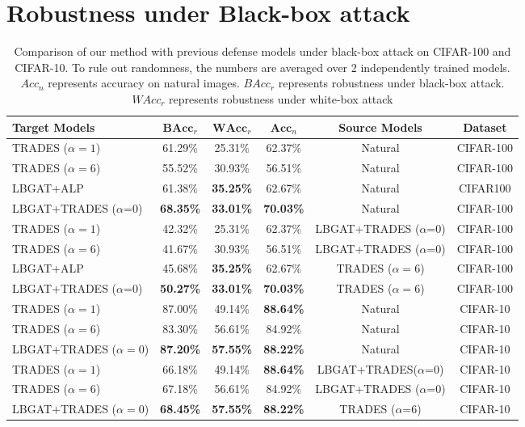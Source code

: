 \documentclass[10pt,twocolumn,letterpaper]{article}
\begin{document}
\vspace{1.0in}	
\section{Robustness under Black-box attack}

\begin{table*}[h]
	\centering
	\caption{Comparison of our method with previous defense models under black-box attack on CIFAR-100 and CIFAR-10. To rule out randomness, the numbers are averaged over 2 independently trained models. $Acc_{n}$ represents accuracy on natural images. $BAcc_{r}$ represents robustness under black-box attack. $WAcc_{r}$ represents robustness under white-box attack}
	\begin{tabular}{l|c|c | c | c|c }
		\textbf{Target Models} &$\textbf{BAcc}_{r}$ &$\textbf{WAcc}_{r}$  & $\textbf{Acc}_{n}$ &\textbf{Source Models}  &\textbf{Dataset}\\
		\hline
		\hline
		TRADES ($\alpha=1$)  &61.29\%  &25.31\%  &62.37\%  &Natural &CIFAR-100\\
		TRADES ($\alpha=6$)  &55.52\%  &30.93\%  &56.51\%  &Natural &CIFAR-100\\
		LBGAT+ALP            &61.38\%  &\textbf{35.25\%}  &62.67\%  &Natural &CIFAR100\\
		LBGAT+TRADES ($\alpha$=0)  &\textbf{68.35\%} &\textbf{33.01\%} &\textbf{70.03\%} &Natural &CIFAR-100\\
		\hline
		TRADES ($\alpha=1$) &42.32\% &25.31\% &62.37\% &LBGAT+TRADES ($\alpha$=0) &CIFAR-100\\
		TRADES ($\alpha=6$) &41.67\% &30.93\% &56.51\% &LBGAT+TRADES ($\alpha$=0) &CIFAR-100\\
		LBGAT+ALP     &45.68\% &\textbf{35.25\%} &62.67\% &TRADES ($\alpha=6$)  &CIFAR-100\\
		LBGAT+TRADES ($\alpha$=0) &\textbf{50.27\%} &\textbf{33.01\%}  &\textbf{70.03\%} &TRADES ($\alpha=6$) &CIFAR-100\\
		\hline
		TRADES ($\alpha=1$)  &87.00\% &49.14\%  &\textbf{88.64\%}  &Natural &CIFAR-10\\
		TRADES ($\alpha=6$)  &83.30\% &56.61\%  &84.92\%  &Natural &CIFAR-10\\
		LBGAT+TRADES ($\alpha=0$)      &\textbf{87.20\%} &\textbf{57.55\%} &\textbf{88.22\%} &Natural &CIFAR-10\\
		\hline
		TRADES ($\alpha=1$) &66.18\% &49.14\% &\textbf{88.64\%} &LBGAT+TRADES($\alpha$=0) &CIFAR-10\\
		TRADES ($\alpha=6$) &67.18\% &56.61\% &84.92\% &LBGAT+TRADES ($\alpha$=0) &CIFAR-10\\
		LBGAT+TRADES ($\alpha=0$)     &\textbf{68.45\%} &\textbf{57.55\%} &\textbf{88.22\%} &TRADES ($\alpha$=6) &CIFAR-10\\
		\hline
		\hline
	\end{tabular}
	\label{tab:black-box_cifar100_cifar10}
\end{table*}
\end{document}
